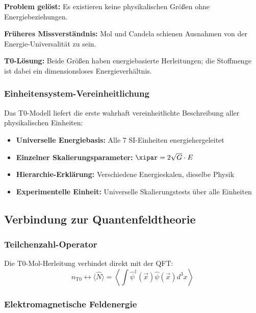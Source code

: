 	\textbf{Problem gelöst:} Es existieren keine physikalischen Größen ohne Energiebeziehungen.
	
	\textbf{Früheres Missverständnis:} Mol und Candela schienen Ausnahmen von der Energie-Universalität zu sein.
	
	\textbf{T0-Lösung:} Beide Größen haben energiebasierte Herleitungen; die Stoffmenge ist dabei ein dimensionsloses Energieverhältnis.
	
	\subsubsection{Einheitensystem-Vereinheitlichung}
	\label{subsubsec:einheitensystem_vereinheitlichung}
	
	Das T0-Modell liefert die erste wahrhaft vereinheitlichte Beschreibung aller physikalischen Einheiten:
	
	\begin{itemize}
		\item \textbf{Universelle Energiebasis:} Alle 7 SI-Einheiten energiehergeleitet
		\item \textbf{Einzelner Skalierungsparameter:} $\xipar = 2\sqrt{G} \cdot E$
		\item \textbf{Hierarchie-Erklärung:} Verschiedene Energieskalen, dieselbe Physik
		\item \textbf{Experimentelle Einheit:} Universelle Skalierungstests über alle Einheiten
	\end{itemize}
	
	\subsection{Verbindung zur Quantenfeldtheorie}
	\label{subsec:qft_verbindung}
	
	\subsubsection{Teilchenzahl-Operator}
	\label{subsubsec:teilchenzahl_operator}
	
	Die T0-Mol-Herleitung verbindet direkt mit der QFT:
	\begin{equation}
		n_{\text{T0}} \leftrightarrow \langle \hat{N} \rangle = \left\langle \int \hat{\psi}^\dagger(\vec{x}) \hat{\psi}(\vec{x}) d^3x \right\rangle
		\label{eq:mol_qft_verbindung}
	\end{equation}
	
	\subsubsection{Elektromagnetische Feldenergie}
	\label{subsubsec:em_feldenergie}
	
